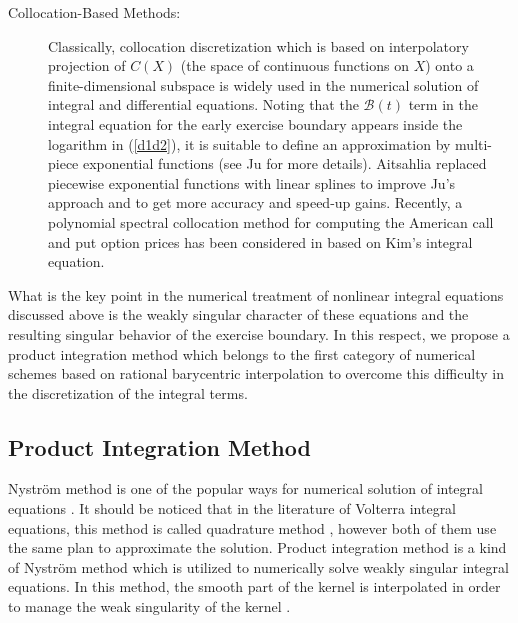 \documentclass[fleqn,final,3p,11pt]{elsarticle}
\theoremstyle{definition}
\theoremstyle{remark}
\numberwithin{equation}{section}
\begin{document}
\begin{description}
\item[Collocation-Based Methods:] Classically, collocation discretization which is based on interpolatory projection of $C(X)$ (the space of continuous functions on $X$) onto a finite-dimensional subspace is widely used in the numerical solution of integral and differential equations. Noting that the $\mathcal{B}(t)$ term in the integral equation for the early exercise boundary appears inside the logarithm in (\ref{d1d2}), it is suitable to define an approximation by multi-piece exponential functions (see Ju \cite{ju} for more details). Aitsahlia \cite{lai2} replaced piecewise exponential functions with linear splines to improve Ju's approach and to get more accuracy and speed-up gains.  Recently, a polynomial spectral collocation method for computing the American call and put option prices has been considered in \cite{andersen} based on Kim's integral equation.
\end{description}
What is the key point in the numerical treatment of nonlinear integral equations discussed above is the weakly singular character of these equations and the resulting singular behavior of the exercise boundary. In this respect, we propose a product integration method which belongs to the first category of numerical schemes based on rational barycentric interpolation to overcome this difficulty in the discretization of the integral terms.
\subsection{Product Integration Method}\label{produc}
Nystr\"{o}m method is one of the popular ways for numerical solution of integral equations \cite{atkinson}. It should be noticed that in the literature of Volterra integral equations, this method is called quadrature method \cite{hack}, however both of them use the same plan to approximate the solution.  Product integration method is a kind of Nystr\"{o}m method which is utilized to numerically solve weakly singular integral equations.  In this method, the smooth part of the kernel is interpolated in order to manage the weak singularity of the kernel \cite{cuminato, orsi,  hoog}.
\end{document}
